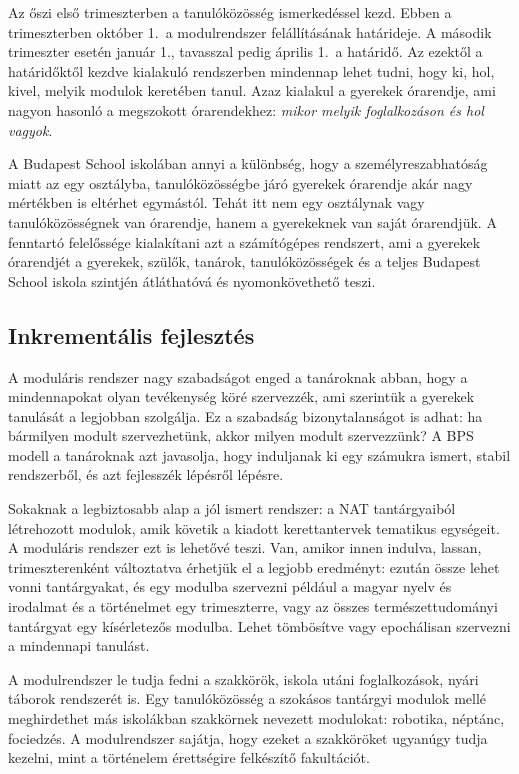 Az őszi első trimeszterben a tanulóközösség ismerkedéssel kezd. Ebben a
trimeszterben október 1.\ a modulrendszer felállításának határideje. A
második trimeszter esetén január 1., tavasszal pedig április 1.\ a határidő.
Az ezektől a határidőktől kezdve kialakuló rendszerben mindennap lehet
tudni, hogy ki, hol, kivel, melyik modulok keretében tanul. Azaz
kialakul a gyerekek órarendje, ami nagyon hasonló a megszokott
órarendekhez: \emph{mikor melyik foglalkozáson és hol vagyok}.

A Budapest School iskolában annyi a különbség, hogy a
személyreszabhatóság miatt az egy osztályba, tanulóközösségbe járó
gyerekek órarendje akár nagy mértékben is eltérhet egymástól. Tehát itt
nem egy osztálynak vagy tanulóközösségnek van órarendje, hanem a
gyerekeknek van saját órarendjük. A fenntartó felelőssége kialakítani azt
a számítógépes rendszert, ami a gyerekek órarendjét a gyerekek, szülők,
tanárok, tanulóközösségek és a teljes Budapest School iskola szintjén
átláthatóvá és nyomonkövethető teszi.

\hypertarget{inkrementalis-fejlesztes}{%
\subsection{Inkrementális fejlesztés}\label{inkrementalis-fejlesztes}}

A moduláris rendszer nagy szabadságot enged a tanároknak abban, hogy a
mindennapokat olyan tevékenység köré szervezzék, ami szerintük a
gyerekek tanulását a legjobban szolgálja. Ez a szabadság
bizonytalanságot is adhat: ha bármilyen modult szervezhetünk, akkor
milyen modult szervezzünk? A BPS modell a tanároknak azt javasolja, hogy
induljanak ki egy számukra ismert, stabil rendszerből, és azt fejlesszék
lépésről lépésre.

Sokaknak a legbiztosabb alap a jól ismert rendszer: a NAT tantárgyaiból
létrehozott modulok, amik követik a kiadott kerettantervek tematikus
egységeit. A moduláris rendszer ezt is lehetővé teszi. Van, amikor innen
indulva, lassan, trimeszterenként változtatva érhetjük el a legjobb
eredményt: ezután össze lehet vonni tantárgyakat, és egy modulba
szervezni például a magyar nyelv és irodalmat és a történelmet egy
trimeszterre, vagy az összes természettudományi tantárgyat egy
kísérletezős modulba. Lehet tömbösítve vagy epochálisan szervezni a
mindennapi tanulást.

A modulrendszer le tudja fedni a szakkörök, iskola utáni foglalkozások,
nyári táborok rendszerét is. Egy tanulóközösség a szokásos tantárgyi
modulok mellé meghirdethet más iskolákban szakkörnek nevezett modulokat:
robotika, néptánc, fociedzés. A modulrendszer sajátja, hogy ezeket a
szakköröket ugyanúgy tudja kezelni, mint a történelem érettségire
felkészítő fakultációt.

